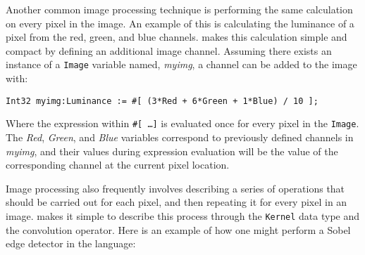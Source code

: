 Another common image processing technique is performing the same calculation
on every pixel in the image. An example of this is calculating the luminance
of a pixel from the red, green, and blue channels. \sys{} makes this calculation
simple and compact by defining an additional image channel. Assuming there exists
an instance of a \texttt{Image} variable named, \emph{myimg}, a channel can be
added to the image with:
\begin{lstlisting}[language=PLTF11]
    Int32 myimg:Luminance := #[ (3*Red + 6*Green + 1*Blue) / 10 ];
\end{lstlisting}
Where the expression within \texttt{\#[ \ldots ]} is evaluated once for every
pixel in the \texttt{Image}. The \emph{Red}, \emph{Green}, and \emph{Blue} variables
correspond to previously defined channels in \emph{myimg}, and their values during
expression evaluation will be the value of the corresponding channel at the current
pixel location.

Image processing also frequently involves describing a series of operations that
should be carried out for each pixel, and then repeating it for every pixel in an
image. \sys{} makes it simple to describe this process through the \texttt{Kernel}
data type and the convolution operator. Here is an example of how one might perform
a Sobel edge detector in the \sys{} language:

